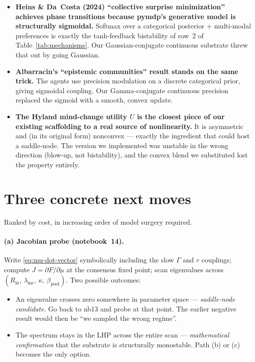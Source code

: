 \documentclass[11pt,a4paper]{article}
\theoremstyle{plain}
\begin{document}
\begin{itemize}
\item \textbf{Heins \& Da~Costa (2024) ``collective surprise
minimization'' achieves phase transitions because pymdp's generative
model is structurally sigmoidal.} Softmax over a categorical
posterior + multi-modal preferences is exactly the tanh-feedback
bistability of row~2 of Table~\ref{tab:mechanisms}. Our
Gaussian-conjugate continuous substrate threw that out by going
Gaussian.

\item \textbf{Albarracin's ``epistemic communities'' result stands on
the same trick.} The agents use precision modulation on a discrete
categorical prior, giving sigmoidal coupling. Our Gamma-conjugate
continuous precision replaced the sigmoid with a smooth, convex
update.

\item \textbf{The Hyland mind-change utility $U$ is the closest piece
of our existing scaffolding to a real source of nonlinearity.} It is
asymmetric and (in its original form) nonconvex --- exactly the
ingredient that could host a saddle-node. The version we implemented
was unstable in the wrong direction (blow-up, not bistability), and
the convex blend we substituted lost the property entirely.
\end{itemize}

\section{Three concrete next moves}
\label{sec:next}

Ranked by cost, in increasing order of model surgery required.

\paragraph{(a) Jacobian probe (notebook~14).} Write
\eqref{eq:mu-dot-vector} symbolically including the slow $\Gamma$ and
$r$ couplings; compute $J = \partial F/\partial \mu$ at the consensus
fixed point; scan eigenvalues across $(R_{\text{in}},\,\lambda_{\text{mc}},\,\kappa,\,\beta_{\text{pool}})$. Two possible outcomes:

\begin{itemize}
\item An eigenvalue crosses zero somewhere in parameter space ---
\emph{saddle-node candidate}. Go back to nb13 and probe at that point.
The earlier negative result would then be ``we sampled the wrong
regime''.
\item The spectrum stays in the LHP across the entire scan ---
\emph{mathematical confirmation} that the substrate is structurally
monostable. Path (b) or (c) becomes the only option.
\end{itemize}
\end{document}
